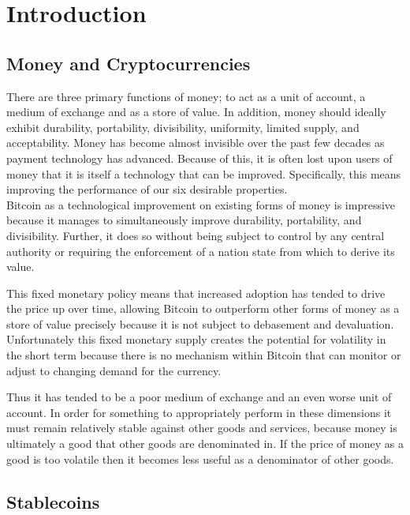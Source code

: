 \section{Introduction}

\subsection{Money and Cryptocurrencies}

There are three primary functions of money; to act as a unit of account, a medium of exchange
and as a store of value. In addition, money should ideally exhibit durability,
portability, divisibility, uniformity, limited supply, and acceptability.
Money has become almost invisible over the past few decades as payment technology has advanced.
Because of this, it is often lost upon users of money that it is itself a technology that can be
improved. Specifically, this means improving the performance of our six desirable properties. \\

\noindent Bitcoin as a technological improvement on existing forms of money is impressive because it manages to
simultaneously improve durability, portability, and divisibility.
Further, it does so without being subject to control by any central authority or requiring the enforcement of a nation state from which to derive its value.

This fixed monetary policy means that increased adoption has tended to drive the price up over time,
allowing Bitcoin to outperform other forms of money as a store of value precisely because it is not
subject to debasement and devaluation. Unfortunately this fixed monetary supply creates the potential
for volatility in the short term because there is no mechanism within Bitcoin that can monitor or
adjust to changing demand for the currency.

Thus it has tended to be a poor medium of exchange and an even worse unit of account.
In order for something to appropriately perform in these dimensions it must remain
relatively stable against other goods and services, because money is ultimately a good that other goods
are denominated in. If the price of money as a good is too volatile then it becomes less useful as a
denominator of other goods. \\

\subsection{Stablecoins}

